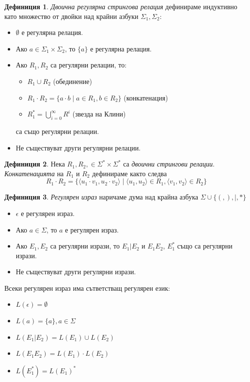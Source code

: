 \documentclass[12pt, oneside]{article}
\theoremstyle{definition}
\newtheorem{definition}{Дефиниция}[section]
\begin{document}
\begin{definition} 
	\emph{Двоична регулярна стрингова релация} дефинираме индуктивно като множество от двойки над крайни азбуки \( \Sigma_1, \Sigma_2 \):
	\begin{itemize}
		\item \( \emptyset \) е регулярна релация.
		\item Ако \( a \in \Sigma_1 \times \Sigma_2 \), то \( \{ a \} \) е регулярна релация.
		\item Ако \( R_1, R_2 \) са регулярни релации, то:
		\begin{itemize}
			\item \( R_1 \cup R_2 \) (обединение)
			\item \( R_1 \cdot R_2 = \{ a \cdot b \mid a \in R_1, b \in R_2 \} \) (конкатенация)
			\item \( R_1^* = \bigcup_{i=0}^{\infty}R^i \) (звезда на Клини)
		\end{itemize}
		са също регулярни релации.
		\item Не съществуват други регулярни релации.
	\end{itemize}
\end{definition}

\begin{definition}
	Нека \( R_1, R_2, \in \Sigma^* \times \Sigma^* \) са \emph{двоични стрингови релации}. \emph{Конкатенацията} на \( R_1 \) и \( R_2 \) дефинираме както следва
	\[ R_1 \cdot R_2 = \{ \langle u_1 \cdot v_1, u_2 \cdot v_2 \rangle \mid \langle u_1, u_2 \rangle \in R_1, \langle v_1, v_2 \rangle \in R_2 \} \]
\end{definition}

\begin{definition} 
	\emph{Регулярен израз} наричаме дума над крайна азбука \( \Sigma \cup \{ (, ), \vert, * \} \)
	\begin{itemize}
		\item \( \epsilon \) е регулярен израз.
		\item Ако \( a \in \Sigma \), то \( a \) е регулярен израз.
		\item Ако \( E_1, E_2 \) са регулярни изрази, то \( E_1 | E_2 \) и \( E_1 E_2 \), \( E_1^* \) също са регулярни изрази.
		\item Не съществуват други регулярни изрази.
	\end{itemize}
	Всеки регулярен израз има сътветстващ регулярен език:
	\begin{itemize}
		\item \( L(\epsilon) = \emptyset \)
		\item \( L(a) = \{ a \}, a \in \Sigma \)
		\item \( L(E_1 | E_2) = L(E_1) \cup L(E_2) \)
		\item \( L(E_1 E_2) = L(E_1) \cdot L(E_2) \)
		\item \( L(E_1^*) = L(E_1)^* \)
	\end{itemize}
\end{definition}
\end{document}
